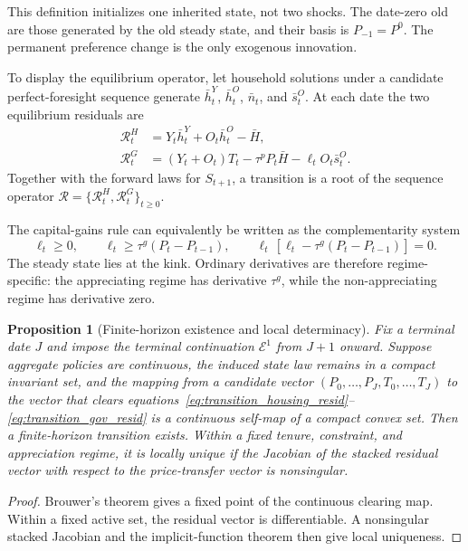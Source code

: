 \documentclass[11pt]{article}
\newtheorem{proposition}{Proposition}
\theoremstyle{definition}
\theoremstyle{remark}
\begin{document}
This definition initializes one inherited state, not two shocks.  The date-zero
old are those generated by the old steady state, and their basis is $P_{-1}=P^0$.
The permanent preference change is the only exogenous innovation.

To display the equilibrium operator, let household solutions under a candidate
perfect-foresight sequence generate
$\bar h_t^Y$, $\bar h_t^O$, $\bar n_t$, and $\bar s_t^O$.  At each date the two
equilibrium residuals are
\begin{align}
 \mathcal R_t^H
 &=Y_t\bar h_t^Y+O_t\bar h_t^O-\bar H,
 \label{eq:transition_housing_resid}\\
 \mathcal R_t^G
 &=(Y_t+O_t)T_t-\tau^pP_t\bar H-\ell_tO_t\bar s_t^O.
 \label{eq:transition_gov_resid}
\end{align}
Together with the forward laws for $S_{t+1}$, a transition is a root of the
sequence operator $\mathcal R=\{\mathcal R_t^H,\mathcal R_t^G\}_{t\geq0}$.

The capital-gains rule can equivalently be written as the complementarity
system
\begin{equation}
 \ell_t\geq0,\qquad
 \ell_t\geq\tau^g(P_t-P_{t-1}),\qquad
 \ell_t\,[\ell_t-\tau^g(P_t-P_{t-1})]=0.
 \label{eq:gains_complementarity}
\end{equation}
The steady state lies at the kink.  Ordinary derivatives are therefore
regime-specific: the appreciating regime has derivative $\tau^g$, while the
non-appreciating regime has derivative zero.

\begin{proposition}[Finite-horizon existence and local determinacy]
Fix a terminal date $J$ and impose the terminal continuation
$\mathcal E^1$ from $J+1$ onward.  Suppose aggregate policies are continuous,
the induced state law remains in a compact invariant set, and the mapping from
a candidate vector
$(P_0,\ldots,P_J,T_0,\ldots,T_J)$ to the vector that clears
equations~\eqref{eq:transition_housing_resid}--\eqref{eq:transition_gov_resid}
is a continuous self-map of a compact convex set.  Then a finite-horizon
transition exists.  Within a fixed tenure, constraint, and appreciation regime,
it is locally unique if the Jacobian of the stacked residual vector with
respect to the price-transfer vector is nonsingular.
\end{proposition}

\begin{proof}
Brouwer's theorem gives a fixed point of the continuous clearing map.  Within a
fixed active set, the residual vector is differentiable.  A nonsingular stacked
Jacobian and the implicit-function theorem then give local uniqueness.
\end{proof}
\end{document}
